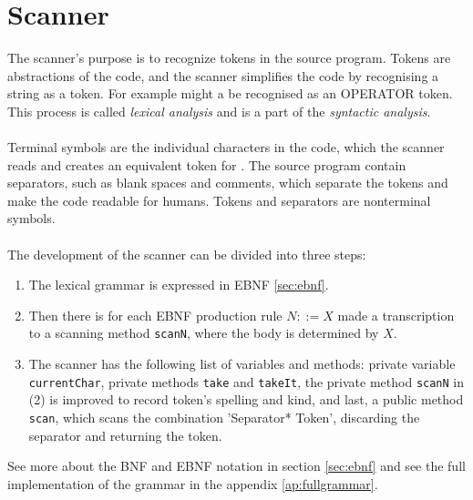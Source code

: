 \section{Scanner}
\label{sec:scannertheory}
The scanner's purpose is to recognize tokens in the source program. Tokens are abstractions of the code, and the scanner simplifies the code by recognising a string as a token. For example might a \+ be recognised as an OPERATOR token. This process is called \textit{lexical analysis} and is a part of the \textit{syntactic analysis}.
\\
\\
Terminal symbols are the individual characters in the code, which the scanner reads and creates an equivalent token for \cite{misc:spo}. The source program contain separators, such as blank spaces and comments, which separate the tokens and make the code readable for humans. Tokens and separators are nonterminal symbols.
\\
\\
The development of the scanner can be divided into three steps:
\begin{enumerate}
\item The lexical grammar is expressed in EBNF \ref{sec:ebnf}.
\item Then there is for each EBNF production rule $N::=X$ made a transcription to a scanning method \texttt{scanN}, where the body is determined by $X$.
\item The scanner has the following list of variables and methods: private variable \texttt{currentChar}, private methods \texttt{take} and \texttt{takeIt}, the private method \texttt{scanN} in (2) is improved to record token's spelling and kind, and last, a public method \texttt{scan}, which scans the combination 'Separator* Token', discarding the separator and returning the token.
\end{enumerate}

See more about the BNF and EBNF notation in section \ref{sec:ebnf} and see the full implementation of the grammar in the appendix \ref{ap:fullgrammar}.